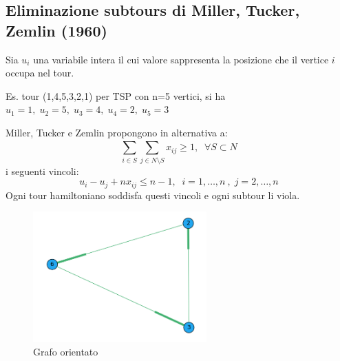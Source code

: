 \subsection{Eliminazione subtours di Miller, Tucker, Zemlin (1960)}
Sia $u_{i}$ una variabile intera il cui valore sappresenta la posizione che il vertice $i$ occupa nel tour.

\begin{center}
	Es. tour (1,4,5,3,2,1) per TSP con n=5 vertici, si ha $u_{1}=1,\;u_{2}=5,\;u_{3}=4,\;u_{4}=2,\;u_{5}=3$	
\end{center}

Miller, Tucker e Zemlin propongono in alternativa a:
\begin{equation}
	\sum_{i\in S}^{}\sum_{j\in N\setminus S}^{} x_{ij} \ge 1,\;\;\forall S\subset N
\end{equation}
i seguenti vincoli:
\begin{equation}
	u_{i}-u_{j}+nx_{ij}\le n-1,\;\; i=1,\dots,n\:,\;j=2,\dots,n
\end{equation}
Ogni tour hamiltoniano soddisfa questi vincoli e ogni subtour li viola.\newline
\begin{figure}
	\vspace{-2em}
	\includegraphics[height=5cm]{images/graph1.png}
	\caption{Grafo orientato}
\end{figure}
\newpage


